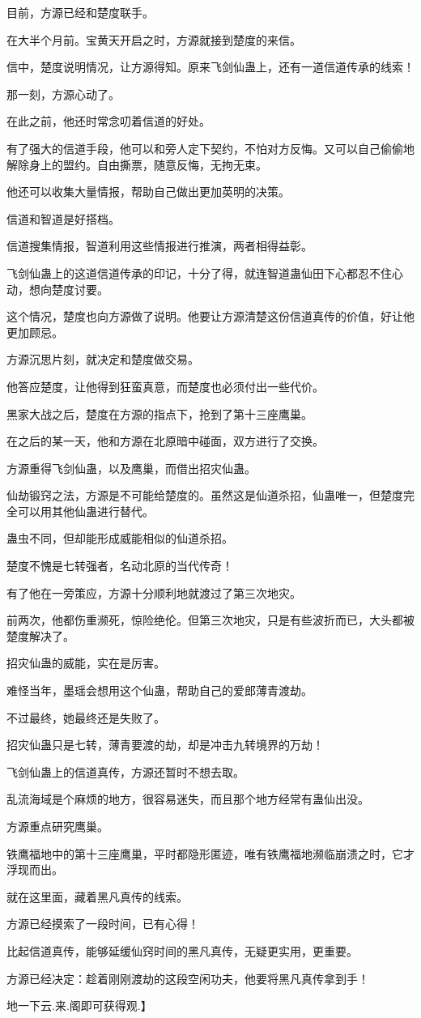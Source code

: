 \begin{this_body}
目前，方源已经和楚度联手。

在大半个月前。宝黄天开启之时，方源就接到楚度的来信。

信中，楚度说明情况，让方源得知。原来飞剑仙蛊上，还有一道信道传承的线索！

那一刻，方源心动了。

在此之前，他还时常念叨着信道的好处。

有了强大的信道手段，他可以和旁人定下契约，不怕对方反悔。又可以自己偷偷地解除身上的盟约。自由撕票，随意反悔，无拘无束。

他还可以收集大量情报，帮助自己做出更加英明的决策。

信道和智道是好搭档。

信道搜集情报，智道利用这些情报进行推演，两者相得益彰。

飞剑仙蛊上的这道信道传承的印记，十分了得，就连智道蛊仙田下心都忍不住心动，想向楚度讨要。

这个情况，楚度也向方源做了说明。他要让方源清楚这份信道真传的价值，好让他更加顾忌。

方源沉思片刻，就决定和楚度做交易。

他答应楚度，让他得到狂蛮真意，而楚度也必须付出一些代价。

黑家大战之后，楚度在方源的指点下，抢到了第十三座鹰巢。

在之后的某一天，他和方源在北原暗中碰面，双方进行了交换。

方源重得飞剑仙蛊，以及鹰巢，而借出招灾仙蛊。

仙劫锻窍之法，方源是不可能给楚度的。虽然这是仙道杀招，仙蛊唯一，但楚度完全可以用其他仙蛊进行替代。

蛊虫不同，但却能形成威能相似的仙道杀招。

楚度不愧是七转强者，名动北原的当代传奇！

有了他在一旁策应，方源十分顺利地就渡过了第三次地灾。

前两次，他都伤重濒死，惊险绝伦。但第三次地灾，只是有些波折而已，大头都被楚度解决了。

招灾仙蛊的威能，实在是厉害。

难怪当年，墨瑶会想用这个仙蛊，帮助自己的爱郎薄青渡劫。

不过最终，她最终还是失败了。

招灾仙蛊只是七转，薄青要渡的劫，却是冲击九转境界的万劫！

飞剑仙蛊上的信道真传，方源还暂时不想去取。

乱流海域是个麻烦的地方，很容易迷失，而且那个地方经常有蛊仙出没。

方源重点研究鹰巢。

铁鹰福地中的第十三座鹰巢，平时都隐形匿迹，唯有铁鹰福地濒临崩溃之时，它才浮现而出。

就在这里面，藏着黑凡真传的线索。

方源已经摸索了一段时间，已有心得！

比起信道真传，能够延缓仙窍时间的黑凡真传，无疑更实用，更重要。

方源已经决定：趁着刚刚渡劫的这段空闲功夫，他要将黑凡真传拿到手！

地一下云.来.阁即可获得观.】

\end{this_body}

